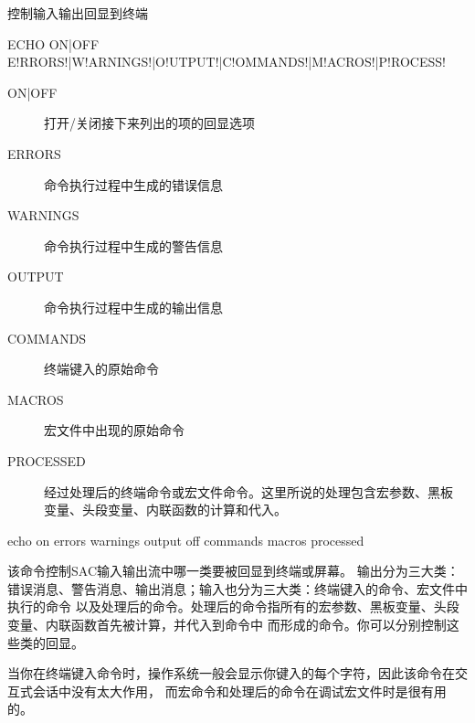 \label{cmd:echo}

控制输入输出回显到终端

\begin{SACSTX}
ECHO ON|OFF E!RRORS!|W!ARNINGS!|O!UTPUT!|C!OMMANDS!|M!ACROS!|P!ROCESS!
\end{SACSTX}

\begin{description}
\item [ON|OFF] 打开/关闭接下来列出的项的回显选项
\item [ERRORS] 命令执行过程中生成的错误信息 
\item [WARNINGS] 命令执行过程中生成的警告信息 
\item [OUTPUT] 命令执行过程中生成的输出信息  
\item [COMMANDS] 终端键入的原始命令 
\item [MACROS] 宏文件中出现的原始命令 
\item [PROCESSED] 经过处理后的终端命令或宏文件命令。这里所说的处理包含宏参数、黑板
    变量、头段变量、内联函数的计算和代入。
\end{description}

\begin{SACDFT}
echo on errors warnings output off commands macros processed
\end{SACDFT}

该命令控制SAC输入输出流中哪一类要被回显到终端或屏幕。
输出分为三大类：错误消息、警告消息、输出消息；输入也分为三大类：终端键入的命令、宏文件中执行的命令
以及处理后的命令。处理后的命令指所有的宏参数、黑板变量、头段变量、内联函数首先被计算，并代入到命令中
而形成的命令。你可以分别控制这些类的回显。

当你在终端键入命令时，操作系统一般会显示你键入的每个字符，因此该命令在交互式会话中没有太大作用，
而宏命令和处理后的命令在调试宏文件时是很有用的。
